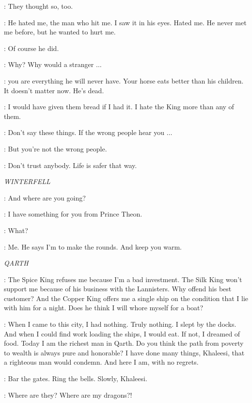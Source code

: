 \SHAE: They thought so, too. 

\SANSA: He hated me, the man who hit me. I saw it in his eyes. Hated me. He never met me before, but he wanted to hurt me. 

\SHAE: Of course he did. 

\SANSA: Why? Why would a stranger $\ldots$  

\SHAE: you are everything he will never have. Your horse eats better than his children. It doesn't matter now. He's dead. 

\SANSA: I would have given them bread if I had it. I hate the King more than any of them. 

\SHAE: Don't say these things. If the wrong people hear you $\ldots$  

\SANSA: But you're not the wrong people. 

\SHAE: Don't trust anybody. Life is safer that way. 


\scene

\textit{WINTERFELL} 


\DRENNAN: And where are you going? 

\OSHA: I have something for you from Prince Theon. 

\DRENNAN: What? 

\OSHA: Me. He says I'm to make the rounds. And keep you warm. 



\scene

\textit{QARTH} 


\DAENERYS: The Spice King refuses me because I'm a bad investment. The Silk King won't support me because of his business with the Lannisters. Why offend his best customer? And the Copper King offers me a single ship on the condition that I lie with him for a night. Does he think I will whore myself for a boat? 

\XARO: When I came to this city, I had nothing. Truly nothing. I slept by the docks. And when I could find work loading the ships, I would eat. If not, I dreamed of food. Today I am the richest man in Qarth. Do you think the path from poverty to wealth is always pure and honorable? I have done many things, Khaleesi, that a righteous man would condemn. And here I am, with no regrets. 


\XARO: Bar the gates. Ring the bells. Slowly, Khaleesi. 

\DAENERYS: Where are they? Where are my dragons?! 


